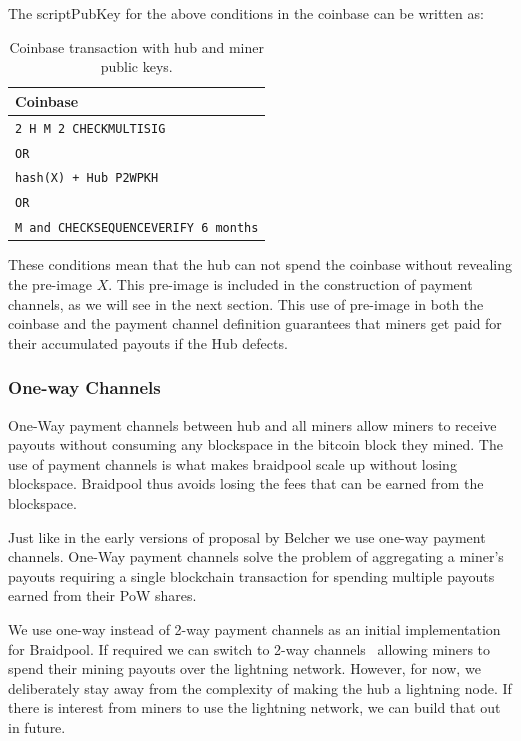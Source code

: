 \documentclass{article}
\begin{document}
The scriptPubKey for the above conditions in the coinbase can be
written as:

\begin{table}
  \centering
  \begin{tabular}{ l }
    \bfseries Coinbase \\
    \midrule
    \verb|2 H M 2 CHECKMULTISIG| \\
    \verb|OR| \\
    \verb|hash(X) + Hub P2WPKH| \\
    \verb|OR| \\
    \verb|M and CHECKSEQUENCEVERIFY 6 months| \\ 
    \midrule
  \end{tabular}
  \caption{Coinbase transaction with hub and miner public keys.}\label{table:coinbase}
\end{table}

These conditions mean that the hub can not spend the coinbase without
revealing the pre-image $X$. This pre-image is included in the
construction of payment channels, as we will see in the next
section. This use of pre-image in both the coinbase and the payment
channel definition guarantees that miners get paid for their
accumulated payouts if the Hub defects.

\subsubsection{One-way Channels}

One-Way payment channels between hub and all miners allow miners to
receive payouts without consuming any blockspace in the bitcoin block
they mined. The use of payment channels is what makes braidpool scale
up without losing blockspace. Braidpool thus avoids losing the fees
that can be earned from the blockspace.

Just like in the early versions of proposal by Belcher we use one-way
payment channels. One-Way payment channels solve the problem of
aggregating a miner's payouts requiring a single blockchain
transaction for spending multiple payouts earned from their PoW
shares.

We use one-way instead of 2-way payment channels as an initial
implementation for Braidpool. If required we can switch to 2-way
channels~\cite{poon2016bitcoin} allowing miners to spend their mining
payouts over the lightning network. However, for now, we deliberately
stay away from the complexity of making the hub a lightning node. If
there is interest from miners to use the lightning network, we can
build that out in future.
\end{document}
